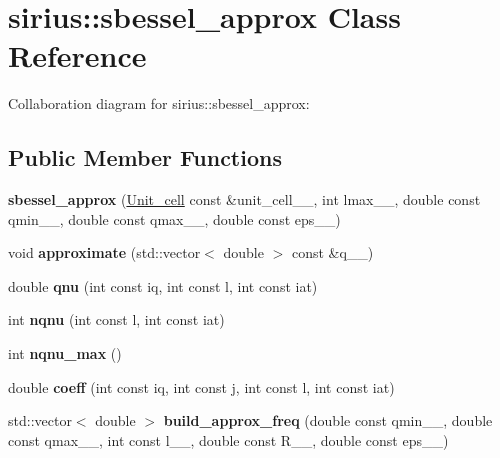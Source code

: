 \hypertarget{classsirius_1_1sbessel__approx}{}\section{sirius\+:\+:sbessel\+\_\+approx Class Reference}
\label{classsirius_1_1sbessel__approx}


Collaboration diagram for sirius\+:\+:sbessel\+\_\+approx\+:
\subsection*{Public Member Functions}
\begin{DoxyCompactItemize}
\item 
\hypertarget{classsirius_1_1sbessel__approx_af763fcff957f25b77fc6e202e1757891}{}{\bfseries sbessel\+\_\+approx} (\hyperlink{classsirius_1_1_unit__cell}{Unit\+\_\+cell} const \&unit\+\_\+cell\+\_\+\+\_\+, int lmax\+\_\+\+\_\+, double const qmin\+\_\+\+\_\+, double const qmax\+\_\+\+\_\+, double const eps\+\_\+\+\_\+)\label{classsirius_1_1sbessel__approx_af763fcff957f25b77fc6e202e1757891}

\item 
\hypertarget{classsirius_1_1sbessel__approx_ac702d5bbe0fc44cc158fe3f7fb9efce5}{}void {\bfseries approximate} (std\+::vector$<$ double $>$ const \&q\+\_\+\+\_\+)\label{classsirius_1_1sbessel__approx_ac702d5bbe0fc44cc158fe3f7fb9efce5}

\item 
\hypertarget{classsirius_1_1sbessel__approx_a8fa1777942e65a4cfa9f716d1a16747c}{}double {\bfseries qnu} (int const iq, int const l, int const iat)\label{classsirius_1_1sbessel__approx_a8fa1777942e65a4cfa9f716d1a16747c}

\item 
\hypertarget{classsirius_1_1sbessel__approx_a4173b4b424f5ff95b738cdddc25f171b}{}int {\bfseries nqnu} (int const l, int const iat)\label{classsirius_1_1sbessel__approx_a4173b4b424f5ff95b738cdddc25f171b}

\item 
\hypertarget{classsirius_1_1sbessel__approx_a5920295fb1569f18cb9bbc20bbb79035}{}int {\bfseries nqnu\+\_\+max} ()\label{classsirius_1_1sbessel__approx_a5920295fb1569f18cb9bbc20bbb79035}

\item 
\hypertarget{classsirius_1_1sbessel__approx_abb1cf2a03f179e11d5a2bd9be277575a}{}double {\bfseries coeff} (int const iq, int const j, int const l, int const iat)\label{classsirius_1_1sbessel__approx_abb1cf2a03f179e11d5a2bd9be277575a}

\item 
\hypertarget{classsirius_1_1sbessel__approx_a782847fbb44cd5dbc282f74420713e83}{}std\+::vector$<$ double $>$ {\bfseries build\+\_\+approx\+\_\+freq} (double const qmin\+\_\+\+\_\+, double const qmax\+\_\+\+\_\+, int const l\+\_\+\+\_\+, double const R\+\_\+\+\_\+, double const eps\+\_\+\+\_\+)\label{classsirius_1_1sbessel__approx_a782847fbb44cd5dbc282f74420713e83}

\end{DoxyCompactItemize}
